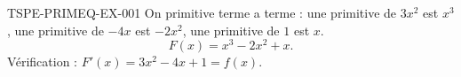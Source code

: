 \begin{corrige}{TSPE-PRIMEQ-EX-001}
On primitive terme a terme : une primitive de $3x^2$ est $x^3$, une primitive de $-4x$ est $-2x^2$, une primitive de $1$ est $x$.
\[
  \boxed{F(x) = x^3 - 2x^2 + x}.
\]
Vérification : $F'(x) = 3x^2 - 4x + 1 = f(x)$. \checkmark
\end{corrige}
